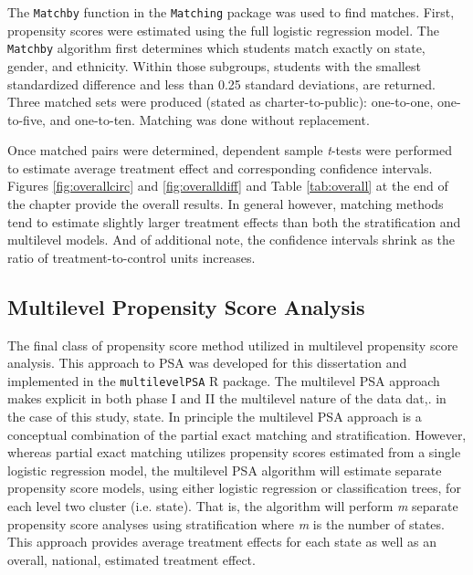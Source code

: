 \documentclass[letterpaper,12p,twoside]{article} %
\begin{document}
The \texttt{Matchby} function in the \texttt{Matching} package \cite{matching} was used to find matches. First, propensity scores were estimated using the full logistic regression model. The \texttt{Matchby} algorithm first determines which students match exactly on state, gender, and ethnicity. Within those subgroups, students with the smallest standardized difference and less than 0.25 standard deviations, are returned. Three matched sets were produced (stated as charter-to-public): one-to-one, one-to-five, and one-to-ten. Matching was done without replacement.

Once matched pairs were determined, dependent sample \textit{t}-tests were performed \cite{Austin2011} to estimate average treatment effect and corresponding confidence intervals. Figures \ref{fig:overallcirc} and \ref{fig:overalldiff} and Table \ref{tab:overall} at the end of the chapter provide the overall results. In general however, matching methods tend to estimate slightly larger treatment effects than both the stratification and multilevel models. And of additional note, the confidence intervals shrink as the ratio of treatment-to-control units increases.


\subsection{Multilevel Propensity Score Analysis}

The final class of propensity score method utilized in multilevel propensity score analysis. This approach to PSA was developed for this dissertation and implemented in the \texttt{multilevelPSA} R package. The multilevel PSA approach makes explicit in both phase I and II the multilevel nature of the data dat,. in the case of this study, state. In principle the multilevel PSA approach is a conceptual combination of the partial exact matching and stratification. However, whereas partial exact matching utilizes propensity scores estimated from a single logistic regression model, the multilevel PSA algorithm will estimate separate propensity score models, using either logistic regression or classification trees, for each level two cluster (i.e. state). That is, the algorithm will perform \textit{m} separate propensity score analyses using stratification where \textit{m} is the number of states. This approach provides average treatment effects for each state as well as an overall, national, estimated treatment effect.
\end{document}
